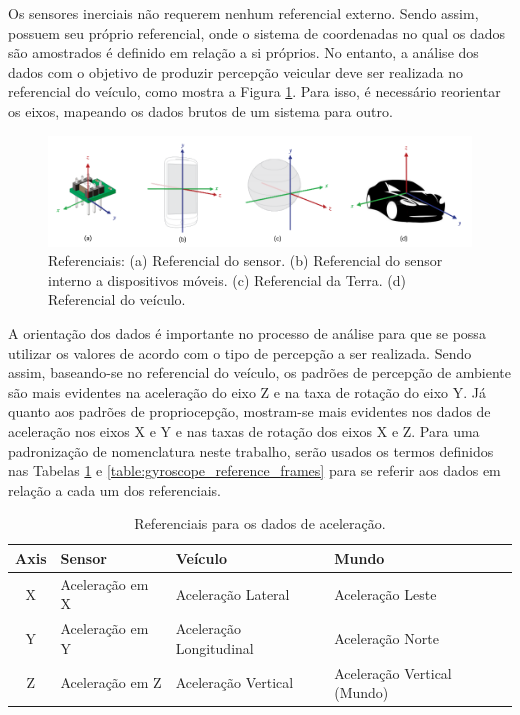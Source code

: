 Os sensores inerciais não requerem nenhum referencial externo. Sendo assim, possuem seu próprio referencial, onde o sistema de coordenadas no qual os dados são amostrados é definido em relação a si próprios. No entanto, a análise dos dados com o objetivo de produzir percepção veicular deve ser realizada no referencial do veículo, como mostra a Figura \ref{fig:quadros_referencia}. Para isso, é necessário reorientar os eixos, mapeando os dados brutos de um sistema para outro.

\begin{figure}[h!]
  \centering
  \caption{Referenciais: (a) Referencial do sensor. (b) Referencial do sensor interno a dispositivos móveis. (c) Referencial da Terra. (d) Referencial do veículo.}
   \label{fig:quadros_referencia}
   \includegraphics[width=1\textwidth]{figuras/fig2.png}
\end{figure}

A orientação dos dados é importante no processo de análise para que se possa utilizar os valores de acordo com o tipo de percepção a ser realizada. Sendo assim, baseando-se no referencial do veículo, os padrões de percepção de ambiente são mais evidentes na aceleração do eixo Z e na taxa de rotação do eixo Y. Já quanto aos padrões de propriocepção, mostram-se mais evidentes nos dados de aceleração nos eixos X e Y e nas taxas de rotação dos eixos X e Z. Para uma padronização de nomenclatura neste trabalho, serão usados os termos definidos nas Tabelas \ref{table:accelerometer_reference_frames} e \ref{table:gyroscope_reference_frames} para se referir aos dados em relação a cada um dos referenciais.

\begin{table}[h!]
    \caption{Referenciais para os dados de aceleração.}
    \label{table:accelerometer_reference_frames}
    \centering
    \small
    \begin{tabular}{clll}
        \toprule
        \textbf{Axis} & \textbf{Sensor} & \textbf{Veículo} & \textbf{Mundo} \\
        \toprule
        X & Aceleração em X & Aceleração Lateral & Aceleração Leste \\
        \midrule
        Y & Aceleração em Y & Aceleração Longitudinal & Aceleração Norte \\
        \midrule
        Z & Aceleração em Z & Aceleração Vertical & Aceleração Vertical (Mundo) \\
        \bottomrule
    \end{tabular}
\end{table}

